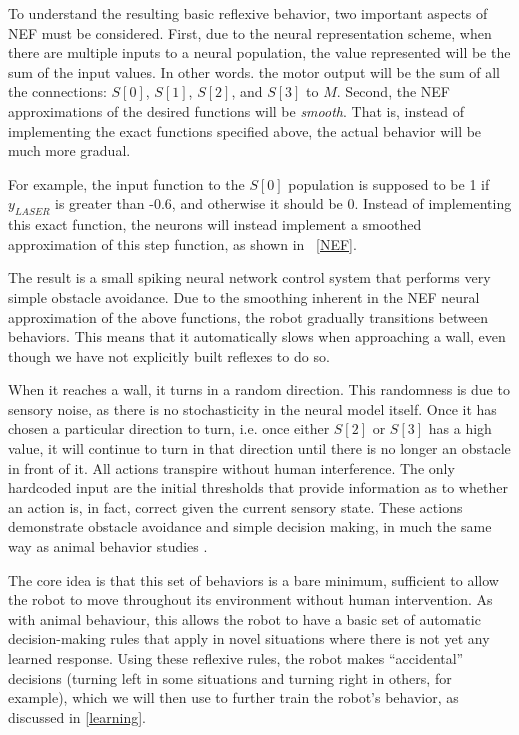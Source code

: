 \documentclass{frontiersSCNS}
\begin{document}
To understand the resulting basic reflexive behavior,
two important aspects of NEF must be considered. First, due to the neural 
representation scheme, when there are multiple inputs to a neural population, 
the value represented will be the sum of the input values. In other words. the 
motor output will be the sum of all the connections: $S[0]$, $S[1]$, $S[2]$, and $S[3]$ to $M$. 
Second, the NEF approximations of the desired functions will be \textit{smooth}. 
That is, instead of implementing the exact functions specified above, the 
actual behavior will be much more gradual. 

For example, the input function to 
the $S[0]$ population is supposed to be 1 if $y_{LASER}$ is greater than -0.6,
and otherwise it should be 0. 
Instead of implementing this exact function, the neurons will instead implement
a smoothed approximation of this step function, as shown in
\figurename~\ref{NEF}.

The result is a small spiking neural network control system that performs very 
simple obstacle avoidance. Due to the smoothing inherent in the NEF neural 
approximation of the above functions, the robot gradually transitions between 
behaviors. This means that it automatically slows when approaching a wall, 
even though we have not explicitly built reflexes to do so.  

When it reaches a wall, it turns in a random direction. This randomness is due 
to sensory noise, as there is no stochasticity in the neural model 
itself. Once it has chosen a particular direction to turn, i.e. once 
either $S[2]$ or $S[3]$ has a high value, it will continue to turn in that 
direction until there is no longer an obstacle in front of it. All actions 
transpire without human interference. The only hardcoded input are the initial 
thresholds that provide information as to whether an action is, in fact, 
correct given the current sensory state. These actions demonstrate obstacle 
avoidance and simple decision making, in much the same way as animal behavior 
studies \citep{kim2007encoding}. 

The core idea is that this set of behaviors is a bare minimum, sufficient to
allow the robot to move throughout its environment without human intervention.
As with animal behaviour, this allows the robot to have a basic set of automatic
decision-making rules that apply in novel situations where there is not yet
any learned response.  Using these reflexive rules, the robot makes ``accidental''
decisions (turning left in some situations and turning right in others, for
example), which we will then use to further train the robot's behavior, as
discussed in \ref{learning}.
\end{document}

